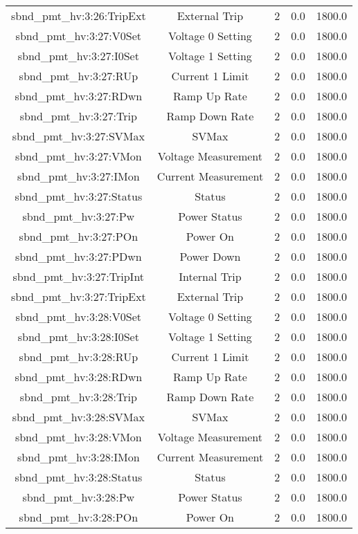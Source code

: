 \begin{center}
\begin{longtable}{c | c c c c }
sbnd\_pmt\_hv:3:26:TripExt & External Trip & 2 & 0.0 & 1800.0\\ 
sbnd\_pmt\_hv:3:27:V0Set & Voltage 0 Setting & 2 & 0.0 & 1800.0\\ 
sbnd\_pmt\_hv:3:27:I0Set & Voltage 1 Setting & 2 & 0.0 & 1800.0\\ 
sbnd\_pmt\_hv:3:27:RUp & Current 1 Limit & 2 & 0.0 & 1800.0\\ 
sbnd\_pmt\_hv:3:27:RDwn & Ramp Up Rate & 2 & 0.0 & 1800.0\\ 
sbnd\_pmt\_hv:3:27:Trip & Ramp Down Rate & 2 & 0.0 & 1800.0\\ 
sbnd\_pmt\_hv:3:27:SVMax & SVMax & 2 & 0.0 & 1800.0\\ 
sbnd\_pmt\_hv:3:27:VMon & Voltage Measurement & 2 & 0.0 & 1800.0\\ 
sbnd\_pmt\_hv:3:27:IMon & Current Measurement & 2 & 0.0 & 1800.0\\ 
sbnd\_pmt\_hv:3:27:Status & Status & 2 & 0.0 & 1800.0\\ 
sbnd\_pmt\_hv:3:27:Pw & Power Status & 2 & 0.0 & 1800.0\\ 
sbnd\_pmt\_hv:3:27:POn & Power On & 2 & 0.0 & 1800.0\\ 
sbnd\_pmt\_hv:3:27:PDwn & Power Down & 2 & 0.0 & 1800.0\\ 
sbnd\_pmt\_hv:3:27:TripInt & Internal Trip & 2 & 0.0 & 1800.0\\ 
sbnd\_pmt\_hv:3:27:TripExt & External Trip & 2 & 0.0 & 1800.0\\ 
sbnd\_pmt\_hv:3:28:V0Set & Voltage 0 Setting & 2 & 0.0 & 1800.0\\ 
sbnd\_pmt\_hv:3:28:I0Set & Voltage 1 Setting & 2 & 0.0 & 1800.0\\ 
sbnd\_pmt\_hv:3:28:RUp & Current 1 Limit & 2 & 0.0 & 1800.0\\ 
sbnd\_pmt\_hv:3:28:RDwn & Ramp Up Rate & 2 & 0.0 & 1800.0\\ 
sbnd\_pmt\_hv:3:28:Trip & Ramp Down Rate & 2 & 0.0 & 1800.0\\ 
sbnd\_pmt\_hv:3:28:SVMax & SVMax & 2 & 0.0 & 1800.0\\ 
sbnd\_pmt\_hv:3:28:VMon & Voltage Measurement & 2 & 0.0 & 1800.0\\ 
sbnd\_pmt\_hv:3:28:IMon & Current Measurement & 2 & 0.0 & 1800.0\\ 
sbnd\_pmt\_hv:3:28:Status & Status & 2 & 0.0 & 1800.0\\ 
sbnd\_pmt\_hv:3:28:Pw & Power Status & 2 & 0.0 & 1800.0\\ 
sbnd\_pmt\_hv:3:28:POn & Power On & 2 & 0.0 & 1800.0\\ 

\end{longtable}
\end{center}
